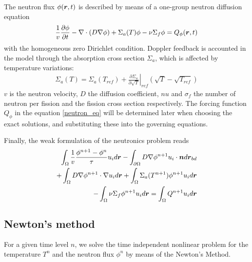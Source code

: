 The neutron flux $\phi(\boldsymbol{r},t)$ is described by means of a  one-group neutron diffusion equation
\begin{align}
  \frac{1}{v} \frac{\partial\phi}{\partial t} 
  - \nabla\cdot(D \nabla \phi) 
  + \Sigma_{a}(T) \phi 
  - \nu \Sigma_{f} \phi
  = Q_{\phi}(\boldsymbol{r},t) \label{neutron_eq}
\end{align}
%
with the homogeneous zero Dirichlet condition. Doppler feedback is accounted in the model through the absorption cross section $\Sigma_{a}$, which is affected by temperature variations:
\begin{align}
  \Sigma_{a}(T) = \Sigma_{a}(T_{ref}) 
  + \left. \frac{\partial \Sigma_{a}}{\partial \sqrt{T}}\right|_{ref} 
    \left( \sqrt{T} - \sqrt{T_{ref}} \right)
\end{align}
%
$v$ is the neutron velocity, $D$ the diffusion coefficient, $nu$ and $\sigma_{f}$ the number of neutron per fission and the fission cross section respectively.  The forcing function $Q_{\phi}$ in the equation \eqref{neutron_eq} will be determined later when choosing the exact solutions, and substituting these into the governing equations.

Finally, the weak formulation of the neutronics problem reads
\begin{align}
  \int_{\Omega} \frac{1}{v} \frac{\phi^{n+1}-\phi{^n}}{\tau} u_i d\boldsymbol{r} 
  - \int_{\partial\Omega} D \nabla \phi^{n+1} u_i \cdot \boldsymbol{n} d\boldsymbol{r}_{bd}& \nonumber \\
  + \int_{\Omega} D \nabla \phi^{n+1} \cdot \nabla u_i d\boldsymbol{r} 
  + \int_{\Omega} \Sigma_{a}(T^{n+1}) \phi^{n+1} u_i d\boldsymbol{r}& \nonumber \\
  - \int_{\Omega} \nu \Sigma_{f} \phi^{n+1} u_i d\boldsymbol{r} 
  = \int_{\Omega} Q^{n+1} u_i d\boldsymbol{r}&
\end{align}


\subsection*{Newton's method}
For a given time level $n$, we solve the time independent nonlinear problem for the temperature $T^{n}$ and the neutron flux $\phi^{n}$ by means of the Newton's Method.

